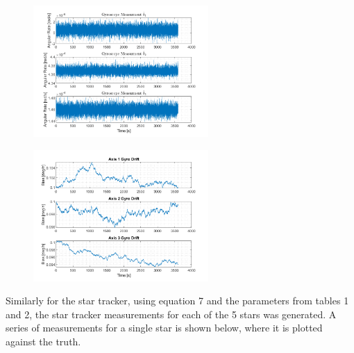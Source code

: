 \documentclass[12pt]{report}
\begin{document}
\begin{figure}[h!]
	\centering
	\begin{minipage}{.5\textwidth}
		\centering
		\includegraphics[height=5cm, keepaspectratio]{GyroOutput.png}
		\label{fig:ex1}
	\end{minipage}%
	\begin{minipage}{.5\textwidth}
		\centering
		\includegraphics[height=5cm, keepaspectratio]{GyroBias.png}
		\label{fig:ex2}
	\end{minipage}
\end{figure}

\noindent Similarly for the star tracker, using equation 7 and the parameters from tables 1 and 2, the star tracker measurements for each of the 5 stars was generated. A series of measurements for a single star is shown below, where it is plotted against the truth.  
\end{document}
